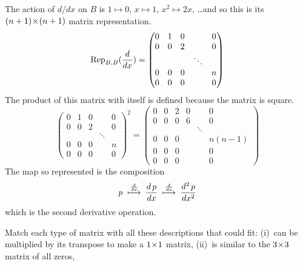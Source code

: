 \begin{exercises}
\begin{answer}
      The action of $d/dx$ on $B$ is 
      $1\mapsto0$, $x\mapsto 1$, $x^2\mapsto 2x$, \ldots and so 
      this is its $\nbyn{(n+1)}$ matrix representation.
      \begin{equation*}
        \rep{\frac{d}{dx}}{B,B}=
        \begin{pmatrix}
          0  &1 &0  &  &0  \\
          0  &0 &2  &  &0  \\
             &  &   &\ddots\\
          0  &0 &0  &  &n  \\
          0  &0 &0  &  &0
        \end{pmatrix}
      \end{equation*}
      The product of this matrix with itself is defined because the matrix is
      square.
      \begin{equation*}
        \begin{pmatrix}
          0  &1 &0  &  &0  \\
          0  &0 &2  &  &0  \\
             &  &   &\ddots\\
          0  &0 &0  &  &n  \\
          0  &0 &0  &  &0
        \end{pmatrix}^2
        =
        \begin{pmatrix}
          0  &0 &2  &0  &        &0       \\
          0  &0 &0  &6  &        &0       \\
             &  &   &   &\ddots  &        \\
          0  &0 &0  &  &         &n(n-1)  \\
          0  &0 &0  &  &         &0       \\
          0  &0 &0  &  &         &0
        \end{pmatrix}
      \end{equation*}
      The map so represented is the composition
      \begin{equation*}
        p\;\mapsunder{\frac{d}{dx}}\;\frac{d\,p}{dx}
         \;\mapsunder{\frac{d}{dx}}\;\frac{d^2\,p}{dx^2}
      \end{equation*}
      which is the second derivative operation.  
     \end{answer}
  \item Match each type of matrix with all these descriptions that could fit:
    (i)~can be multiplied by its transpose to make a $\nbyn{1}$ matrix, 
    (ii)~is similar to the $\nbyn{3}$ matrix of all zeros,

\end{exercises}
